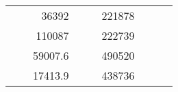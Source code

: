 \begin{table}[]
\begin{tabular}{|ccrccrccc}
\multicolumn{1}{|c|}{\cellcolor[HTML]{FFFFC7}}                                & \multicolumn{1}{c|}{\cellcolor[HTML]{DAE8FC}}                      & \multicolumn{1}{r|}{\cellcolor[HTML]{DAE8FC}36392}     & \multicolumn{1}{c|}{\cellcolor[HTML]{FFFFC7}}                                & \multicolumn{1}{c|}{\cellcolor[HTML]{DAE8FC}}                       & \multicolumn{1}{r|}{\cellcolor[HTML]{DDFDFF}221878}    &                                                                              &                                                                    &                                                        \\ \cline{3-3} \cline{6-6}
\multicolumn{1}{|c|}{\cellcolor[HTML]{FFFFC7}}                                & \multicolumn{1}{c|}{\cellcolor[HTML]{DAE8FC}}                      & \multicolumn{1}{r|}{\cellcolor[HTML]{DDFDFF}110087}    & \multicolumn{1}{c|}{\cellcolor[HTML]{FFFFC7}}                                & \multicolumn{1}{c|}{\cellcolor[HTML]{DAE8FC}}                       & \multicolumn{1}{r|}{\cellcolor[HTML]{DAE8FC}222739}    &                                                                              &                                                                    &                                                        \\ \cline{3-3} \cline{6-6}
\multicolumn{1}{|c|}{\cellcolor[HTML]{FFFFC7}}                                & \multicolumn{1}{c|}{\cellcolor[HTML]{DAE8FC}}                      & \multicolumn{1}{r|}{\cellcolor[HTML]{DAE8FC}59007.6}   & \multicolumn{1}{c|}{\cellcolor[HTML]{FFFFC7}}                                & \multicolumn{1}{c|}{\cellcolor[HTML]{DAE8FC}}                       & \multicolumn{1}{r|}{\cellcolor[HTML]{DDFDFF}490520}    &                                                                              &                                                                    &                                                        \\ \cline{3-3} \cline{6-6}
\multicolumn{1}{|c|}{\cellcolor[HTML]{FFFFC7}}                                & \multicolumn{1}{c|}{\cellcolor[HTML]{DAE8FC}}                      & \multicolumn{1}{r|}{\cellcolor[HTML]{DDFDFF}17413.9}   & \multicolumn{1}{c|}{\cellcolor[HTML]{FFFFC7}}                                & \multicolumn{1}{c|}{\cellcolor[HTML]{DAE8FC}}                       & \multicolumn{1}{r|}{\cellcolor[HTML]{DAE8FC}438736}    &                                                                              &                                                                    &                                                        \\ \cline{3-3} \cline{6-6}

\end{tabular}
\end{table}
